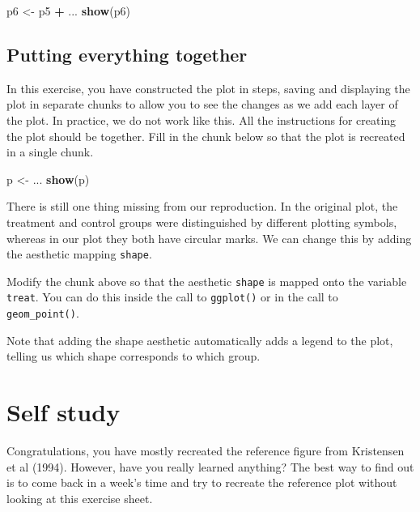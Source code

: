 \documentclass[
]{book}
\newenvironment{Shaded}{\begin{snugshade}}{\end{snugshade}}
\newcommand{\FunctionTok}[1]{\textcolor[rgb]{0.13,0.29,0.53}{\textbf{#1}}}
\newcommand{\NormalTok}[1]{#1}
\newcommand{\OtherTok}[1]{\textcolor[rgb]{0.56,0.35,0.01}{#1}}
\newcommand{\SpecialCharTok}[1]{\textcolor[rgb]{0.81,0.36,0.00}{\textbf{#1}}}
\begin{document}
\begin{Shaded}
\begin{Highlighting}[]
\NormalTok{p6 }\OtherTok{\textless{}{-}}\NormalTok{ p5 }\SpecialCharTok{+}\NormalTok{ ...}
\FunctionTok{show}\NormalTok{(p6)}
\end{Highlighting}
\end{Shaded}

\subsection{Putting everything together}\label{putting-everything-together}

In this exercise, you have constructed the plot in steps, saving and displaying the plot in separate chunks to allow you to see the changes as we add each layer of the plot. In practice, we do not work like this. All the instructions for creating the plot should be together. Fill in the chunk below so that the plot is recreated in a single chunk.

\begin{Shaded}
\begin{Highlighting}[]
\NormalTok{p }\OtherTok{\textless{}{-}}\NormalTok{ ...}
\FunctionTok{show}\NormalTok{(p)}
\end{Highlighting}
\end{Shaded}

There is still one thing missing from our reproduction. In the original plot, the treatment and control groups were distinguished by different plotting symbols, whereas in our plot they both have circular marks. We can change this by adding the aesthetic mapping \texttt{shape}.

Modify the chunk above so that the aesthetic \texttt{shape} is mapped onto the variable \texttt{treat}. You can do this inside the call to \texttt{ggplot()} or in the call to \texttt{geom\_point()}.

Note that adding the shape aesthetic automatically adds a legend to the plot, telling us which shape corresponds to which group.

\section{Self study}\label{self-study}

Congratulations, you have mostly recreated the reference figure from Kristensen et al (1994). However, have you really learned anything? The best way to find out is to come back in a week's time and try to recreate the reference plot without looking at this exercise sheet.
\end{document}
